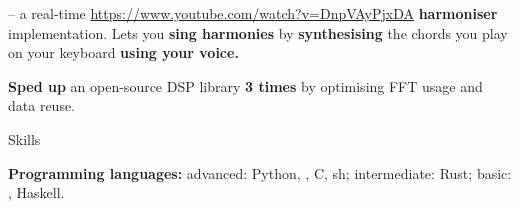  –
%
a real-time \Cpp{} \url{https://www.youtube.com/watch?v=DnpVAyPjxDA}{{\bf
harmoniser}} implementation.
\: Lets you {\bf sing harmonies} by {\bf synthesising} the chords you play on your keyboard {\bf using your voice.}

\: {\bf Sped up} an open-source DSP library {\bf 3 times} by optimising FFT usage and data reuse.

\endlist





%
%


\sekce Skills
 
{\bf Programming languages:} {\af advanced:} {\B Python}, {\B \Cpp}, {\B C}, {\B sh}; {\af intermediate:} {\B Rust}; {\af basic:} \Cis{}, Haskell.

